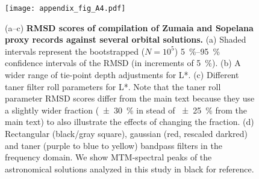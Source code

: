 \documentclass[draft]{agujournal2019}
\begin{document}
\begin{figure}
    \centering
    \texttt{[image: appendix\_fig\_A4.pdf]}
    \caption{
        (a--c) \textbf{\gls{RMSD} scores of compilation of Zumaia and Sopelana proxy records against several orbital solutions.}
        (a)\label{fig:full-RMSD-boot} Shaded intervals represent the bootstrapped (\(N = 10^{5}\)) \qtyrange{5}{95}{\percent} confidence intervals of the \gls{RMSD} (in increments of \qty{5}{\percent}).
        (b)\label{fig:full-RMSD-tie-error} A wider range of tie-point depth adjustments for \gls{L*}.
        (c)\label{fig:full-RMSD-taner} Different taner filter roll parameters for \gls{L*}.
        Note that the taner roll parameter \gls{RMSD} scores differ from the main text because they use a slightly wider fraction (\qty{\pm30}{\percent} in stead of \qty{\pm25}{\percent} from the main text) to also illustrate the effects of changing the fraction.
        (d)\label{fig:filter-windows} Rectangular (black/gray square), gaussian (red, rescaled darkred) and taner (purple to blue to yellow) bandpass filters in the frequency domain.
        We show MTM-spectral peaks of the astronomical solutions analyzed in this study in black for reference.
    }
\end{figure}
\end{document}
